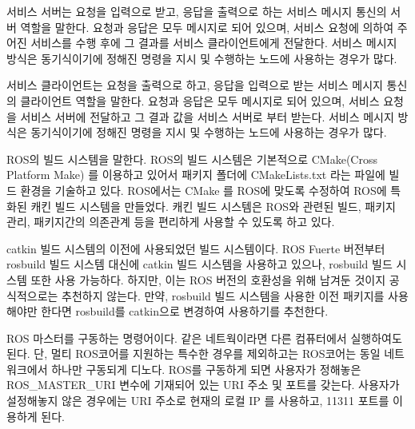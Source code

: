 \vspace{\baselineskip}
\begin{definition}\label{def:RosServiceServer}
서비스 서버는 요청을 입력으로 받고, 응답을 출력으로 하는 서비스 메시지 통신의 서버 역할을 말한다. 요청과 응답은 모두 메시지로 되어 있으며, 서비스 요청에 의하여 주어진 서비스를 수행 후에 그 결과를 서비스 클라이언트에게 전달한다. 서비스 메시지 방식은 동기식이기에 정해진 명령을 지시 및 수행하는 노드에 사용하는 경우가 많다.
\end{definition}

\vspace{\baselineskip}
\begin{definition}\label{def:RosServiceClient}
서비스 클라이언트는 요청을 출력으로 하고, 응답을 입력으로 받는 서비스 메시지 통신의 클라이언트 역할을 말한다. 요청과 응답은 모두 메시지로 되어 있으며, 서비스 요청을 서비스 서버에 전달하고 그 결과 값을 서비스 서버로 부터 받는다. 서비스 메시지 방식은 동기식이기에 정해진 명령을 지시 및 수행하는 노드에 사용하는 경우가 많다.
\end{definition}

\vspace{\baselineskip}
\begin{definition}[캐킨(catkin)]\label{def:RosCatkin}
ROS의 빌드 시스템을 말한다. ROS의 빌드 시스템은 기본적으로 CMake(Cross Platform Make) 를 이용하고 있어서 패키지 폴더에 CMakeLists.txt 라는 파일에 빌드 환경을 기술하고 있다. ROS에서는 CMake 를 ROS에 맞도록 수정하여 ROS에 특화된 캐킨 빌드 시스템을 만들었다. 캐킨 빌드 시스템은 ROS와 관련된 빌드, 패키지 관리, 패키지간의 의존관계 등을 편리하게 사용할 수 있도록 하고 있다. 
\end{definition}

\vspace{\baselineskip}
\begin{definition}\label{def:RosRosbuild}
catkin 빌드 시스템의 이전에 사용되었던 빌드 시스템이다. ROS Fuerte 버전부터 rosbuild 빌드 시스템 대신에 catkin 빌드 시스템을 사용하고 있으나, rosbuild 빌드 시스템 또한 사용 가능하다. 하지만, 이는 ROS 버전의 호환성을 위해 남겨둔 것이지 공식적으로는 추천하지 않는다. 만약, rosbuild 빌드 시스템을 사용한 이전 패키지를 사용해야만 한다면 rosbuild를 catkin으로 변경하여 사용하기를 추천한다. 
\end{definition}

\vspace{\baselineskip}
\begin{definition}\label{def:RosCore}
ROS 마스터를 구동하는 명령어이다. 같은 네트웍이라면 다른 컴퓨터에서 실행하여도 된다. 단, 멀티 ROS코어를 지원하는 특수한 경우를 제외하고는 ROS코어는 동일 네트워크에서 하나만 구동되게 디노다. ROS를 구동하게 되면 사용자가 정해놓은 ROS\_MASTER\_URI 변수에 기재되어 있는 URI 주소 및 포트를 갖는다. 사용자가 설정해놓지 않은 경우에는 URI 주소로 현재의 로컬 IP 를 사용하고, 11311 포트를 이용하게 된다.
\end{definition}

